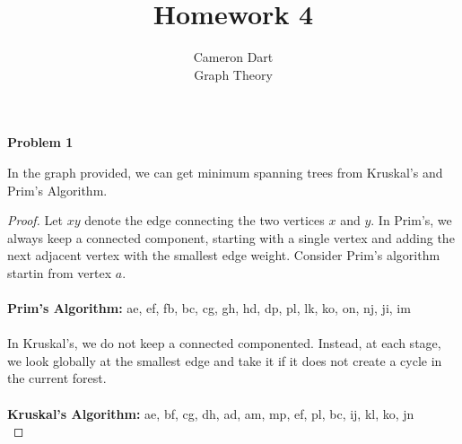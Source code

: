 \documentclass{article}
\newenvironment{claim}[2][Claim]{\begin{trivlist}
		\item[\hskip \labelsep {\bfseries #1}\hskip \labelsep {\bfseries #2}]}{\end{trivlist}}
\begin{document}
\title{Homework 4} 
\author{Cameron Dart\\ Graph Theory} 

\maketitle

\noindent \textbf{Problem 1}
\begin{claim}{}
	In the graph provided, we can get minimum spanning trees from Kruskal's and Prim's Algorithm.
\end{claim}
\begin{proof}
Let $xy$ denote the edge connecting the two vertices $x$ and $y$. In Prim's, we always keep a connected component, starting with a single vertex and adding the next adjacent vertex with the smallest edge weight. Consider Prim's algorithm startin from vertex $a$.
\\\\\textbf{Prim's Algorithm:} ae, ef, fb, bc, cg, gh, hd, dp, pl, lk, ko, on, nj, ji, im
\\\\ In Kruskal's, we do not keep a connected componented. Instead, at each stage, we look globally at the smallest edge and take it if it does not create a cycle in the current forest.
\\\\\textbf{Kruskal's Algorithm:} ae, bf, cg, dh, ad, am, mp, ef, pl, bc, ij, kl, ko, jn\\
\end{proof}
\end{document}
